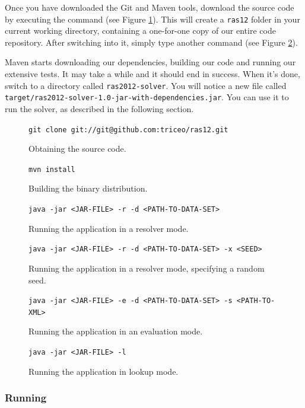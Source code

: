 \documentclass[10pt,a4paper,final]{article}
\begin{document}
Once you have downloaded the Git and Maven tools, download the source code by executing the command (see Figure \ref{figure:git}). This will create a \texttt{ras12} folder in your current working directory, containing a one-for-one copy of our entire code repository. After switching into it, simply type another command (see Figure \ref{figure:maven}).

Maven starts downloading our dependencies, building our code and running our extensive tests. It may take a while and it should end in success. When it's done, switch to a directory called \texttt{ras2012-solver}. You will notice a new file called \texttt{target/ras2012-solver-1.0-jar-with-dependencies.jar}. You can use it to run the solver, as described in the following section.

\begin{figure}
\centering
\texttt{git clone git://git@github.com:triceo/ras12.git}
\caption{Obtaining the source code.}
\label{figure:git}
\end{figure}

\begin{figure}
\centering
\texttt{mvn install}
\caption{Building the binary distribution.}
\label{figure:maven}
\end{figure}

\begin{figure}
\centering
\texttt{java -jar <JAR-FILE> -r -d <PATH-TO-DATA-SET>}
\caption{Running the application in a resolver mode.}
\label{figure:run-resolver}
\end{figure}

\begin{figure}
\centering
\texttt{java -jar <JAR-FILE> -r -d <PATH-TO-DATA-SET> -x <SEED>}
\caption{Running the application in a resolver mode, specifying a random seed.}
\label{figure:run-resolver-seed}
\end{figure}

\begin{figure}
\centering
\texttt{java -jar <JAR-FILE> -e -d <PATH-TO-DATA-SET> -s <PATH-TO-XML>}
\caption{Running the application in an evaluation mode.}
\label{figure:run-evaluation}
\end{figure}

\begin{figure}
\centering
\texttt{java -jar <JAR-FILE> -l}
\caption{Running the application in lookup mode.}
\label{figure:run-lookup}
\end{figure}

\subsubsection{Running}
\end{document}
